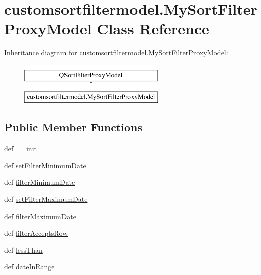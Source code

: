 \hypertarget{classcustomsortfiltermodel_1_1MySortFilterProxyModel}{}\section{customsortfiltermodel.\+My\+Sort\+Filter\+Proxy\+Model Class Reference}
\label{classcustomsortfiltermodel_1_1MySortFilterProxyModel}
Inheritance diagram for customsortfiltermodel.\+My\+Sort\+Filter\+Proxy\+Model\+:\begin{figure}[H]
\begin{center}
\leavevmode
\includegraphics[height=2.000000cm]{classcustomsortfiltermodel_1_1MySortFilterProxyModel}
\end{center}
\end{figure}
\subsection*{Public Member Functions}
\begin{DoxyCompactItemize}
\item 
def \hyperlink{classcustomsortfiltermodel_1_1MySortFilterProxyModel_a7bc2d2dfc0e7216604e714215a9ca5ca}{\+\_\+\+\_\+init\+\_\+\+\_\+}
\item 
def \hyperlink{classcustomsortfiltermodel_1_1MySortFilterProxyModel_ab47b6b136a4317f749eb5487dde0615e}{set\+Filter\+Minimum\+Date}
\item 
def \hyperlink{classcustomsortfiltermodel_1_1MySortFilterProxyModel_a27335a3708bff14d62ceeebd0556765c}{filter\+Minimum\+Date}
\item 
def \hyperlink{classcustomsortfiltermodel_1_1MySortFilterProxyModel_a97159a003aee7aa4e5087851a23ff341}{set\+Filter\+Maximum\+Date}
\item 
def \hyperlink{classcustomsortfiltermodel_1_1MySortFilterProxyModel_ad695024671624967bdd586a6593ca881}{filter\+Maximum\+Date}
\item 
def \hyperlink{classcustomsortfiltermodel_1_1MySortFilterProxyModel_ae62b0276977b2c50af9f85274786403c}{filter\+Accepts\+Row}
\item 
def \hyperlink{classcustomsortfiltermodel_1_1MySortFilterProxyModel_aed6c7670610fc6bd37ecbcbc86ab5034}{less\+Than}
\item 
def \hyperlink{classcustomsortfiltermodel_1_1MySortFilterProxyModel_a56ba19984651cbbd801824f41b40ea82}{date\+In\+Range}
\end{DoxyCompactItemize}
